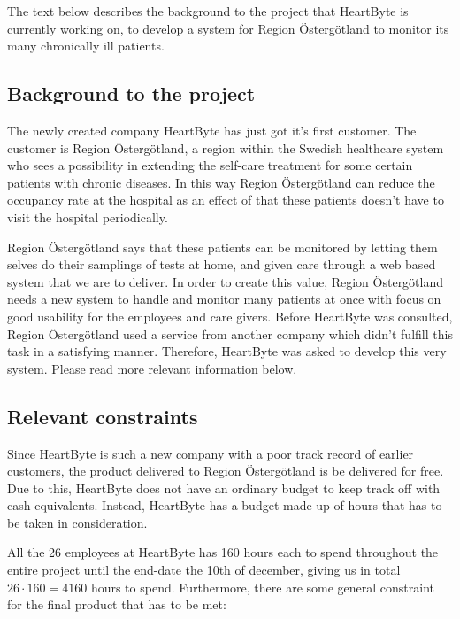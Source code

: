 \setlength{\parindent}{0pt}
The text below describes the background to the project that HeartByte is currently working on, to develop a system for Region Östergötland to monitor its many chronically ill patients.

\subsection{Background to the project}
The newly created company HeartByte has just got it's first customer. The customer is Region Östergötland, a region within the Swedish healthcare system who sees a possibility in extending the self-care treatment for some certain patients with chronic diseases. In this way Region Östergötland can reduce the occupancy rate at the hospital as an effect of that these patients doesn't have to visit the hospital periodically. \vspace{5mm}

Region Östergötland says that these patients can be monitored by letting them selves do their samplings of tests at home, and given care through a web based system that we are to deliver. In order to create this value, Region Östergötland needs a new system to handle and monitor many patients at once with focus on good usability for the employees and care givers. Before HeartByte was consulted, Region Östergötland used a service from another company which didn't fulfill this task in a satisfying manner. Therefore, HeartByte was asked to develop this very system. Please read more relevant information below.

\subsection{Relevant constraints}
Since HeartByte is such a new company with a poor track record of earlier customers, the product delivered to Region Östergötland is be delivered for free. Due to this, HeartByte does not have an ordinary budget to keep track off with cash equivalents. Instead, HeartByte has a budget made up of hours that has to be taken in consideration. \vspace{5mm}

All the 26 employees at HeartByte has 160 hours each to spend throughout the entire project until the end-date the 10th of december, giving us in total $26 \cdot 160 = 4160$ hours to spend. Furthermore, there are some general constraint for the final product that has to be met:


